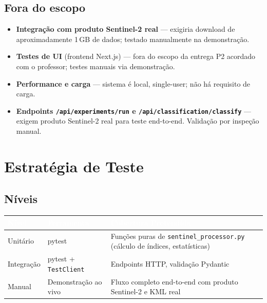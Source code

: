 \documentclass[11pt, a4paper]{article}
\begin{document}
\subsection{Fora do escopo}

\begin{itemize}
  \item \textbf{Integração com produto Sentinel-2 real} --- exigiria download de aproximadamente 1\,GB de dados; testado manualmente na demonstração.
  \item \textbf{Testes de UI} (frontend Next.js) --- fora do escopo da entrega P2 acordado com o professor; testes manuais via demonstração.
  \item \textbf{Performance e carga} --- sistema é local, single-user; não há requisito de carga.
  \item \textbf{Endpoints \texttt{/api/experiments/run} e \texttt{/api/classification/classify}} --- exigem produto Sentinel-2 real para teste end-to-end. Validação por inspeção manual.
\end{itemize}

\section{Estratégia de Teste}

\subsection{Níveis}

\begin{table}[H]
\centering
\small
{}
\begin{tabularx}{\textwidth}{@{}llX@{}}
\toprule
\rowcolor{tabheader}\textcolor{white}{\textbf{Nível}} & \textcolor{white}{\textbf{Ferramenta}} & \textcolor{white}{\textbf{Cobertura Pretendida}}\\
\midrule
Unitário & pytest & Funções puras de \texttt{sentinel\_processor.py} (cálculo de índices, estatísticas)\\
Integração & pytest + \texttt{TestClient} & Endpoints HTTP, validação Pydantic\\
Manual & Demonstração ao vivo & Fluxo completo end-to-end com produto Sentinel-2 e KML real\\
\bottomrule
\end{tabularx}
\end{table}
\end{document}
